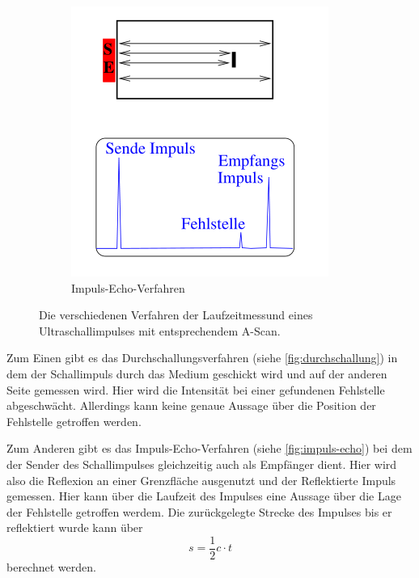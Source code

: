 \begin{figure}
\begin{subfigure}{0.3\textwidth}
        \includegraphics[width=\textwidth]{images/bild02.png}
        \caption{Impuls-Echo-Verfahren}
        \label{fig:impuls-echo}
    \end{subfigure}
    \caption{Die verschiedenen Verfahren der Laufzeitmessund eines Ultraschallimpulses mit entsprechendem A-Scan.\cite{US1}}
    \label{fig:verfahren}
\end{figure}

Zum Einen gibt es das Durchschallungsverfahren (siehe \autoref{fig:durchschallung}) in dem der Schallimpuls durch das Medium geschickt wird und auf der anderen Seite gemessen wird.
Hier wird die Intensität bei einer gefundenen Fehlstelle abgeschwächt. 
Allerdings kann keine genaue Aussage über die Position der Fehlstelle getroffen werden.

Zum Anderen gibt es das Impuls-Echo-Verfahren (siehe \autoref{fig:impuls-echo}) bei dem der Sender des Schallimpulses gleichzeitig auch als Empfänger dient.
Hier wird also die Reflexion an einer Grenzfläche ausgenutzt und der Reflektierte Impuls gemessen.
Hier kann über die Laufzeit des Impulses eine Aussage über die Lage der Fehlstelle getroffen werdem.
Die zurückgelegte Strecke des Impulses bis er reflektiert wurde kann über
\begin{equation}
    s = \frac{1}{2} c \cdot t
    \label{eq:strecke}
\end{equation}
berechnet werden.

